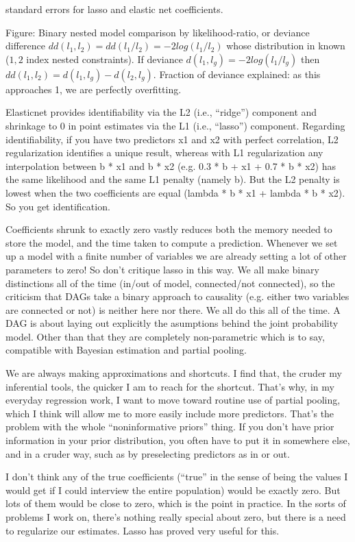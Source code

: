 \documentclass{article}
\begin{document}
standard errors for lasso and elastic net coefficients.

Figure: Binary nested model comparison by likelihood-ratio, or deviance difference $dd(l_1,l_2) = dd(l_1/l_2) = -2log(l_1/l_2)$ whose distribution in known ($1,2$ index nested constraints). If deviance $d(l_1,l_g) = -2log(l_1/l_g)$ then $dd(l_1,l_2) = d(l_1,l_g) - d(l_2, l_g)$. Fraction of deviance explained: as this approaches 1, we are perfectly overfitting.

Elasticnet provides identifiability via the L2 (i.e., “ridge”) component and shrinkage to 0 in point estimates via the L1 (i.e., “lasso”) component. Regarding identifiability, if you have two predictors x1 and x2 with perfect correlation, L2 regularization identifies a unique result, whereas with L1 regularization any interpolation between b * x1 and b * x2 (e.g. 0.3 * b + x1 + 0.7 * b * x2) has the same likelihood and the same L1 penalty (namely b). But the L2 penalty is lowest when the two coefficients are equal (lambda * b * x1 + lambda * b * x2). So you get identification.

Coefficients shrunk to exactly zero vastly reduces both the memory needed to store the model, and the time taken to compute a prediction. Whenever we set up a model with a finite number of variables we are already setting a lot of other parameters to zero! So don't critique lasso in this way. We all make binary distinctions all of the time (in/out of model, connected/not connected), so the criticism that DAGs take a binary approach to causality (e.g. either two variables are connected or not) is neither here nor there. We all do this all of the time. A DAG is about laying out explicitly the asumptions behind the joint probability model. Other than that they are completely non-parametric which is to say, compatible with Bayesian estimation and partial pooling.

We are always making approximations and shortcuts. I find that, the cruder my inferential tools, the quicker I am to reach for the shortcut. That’s why, in my everyday regression work, I want to move toward routine use of partial pooling, which I think will allow me to more easily include more predictors. That’s the problem with the whole “noninformative priors” thing. If you don’t have prior information in your prior distribution, you often have to put it in somewhere else, and in a cruder way, such as by preselecting predictors as in or out.

I don’t think any of the true coefficients (“true” in the sense of being the values I would get if I could interview the entire population) would be exactly zero. But lots of them would be close to zero, which is the point in practice. In the sorts of problems I work on, there’s nothing really special about zero, but there is a need to regularize our estimates. Lasso has proved very useful for this.
\end{document}
